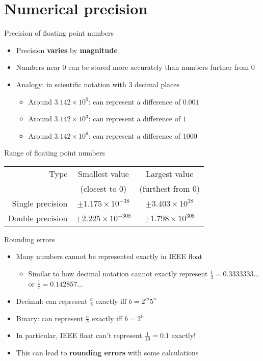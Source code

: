 \part{Numerical precision}
\frame{\partpage}

\begin{frame}{Precision of floating point numbers}
	\begin{itemize}
		\pause\item Precision \textbf{varies} by \textbf{magnitude}
		\pause\item Numbers near 0 can be stored more accurately than numbers further from 0
		\pause\item Analogy: in scientific notation with 3 decimal places
			\begin{itemize}
				\pause\item Around $3.142 \times 10^0$: can represent a difference of $0.001$
				\pause\item Around $3.142 \times 10^3$: can represent a difference of $1$
				\pause\item Around $3.142 \times 10^6$: can represent a difference of $1000$
			\end{itemize}
	\end{itemize}
\end{frame}

\begin{frame}[fragile]{Range of floating point numbers}
	\begin{center}
		\begin{tabular}{|r|cc|}
			\hline
			Type & Smallest value & Largest value \\
			& (closest to 0) & (furthest from 0) \\\hline
			Single precision & $\pm 1.175 \times 10^{-38}$ & $\pm 3.403 \times 10^{38}$ \\\hline
			Double precision & $\pm 2.225 \times 10^{-308}$ & $\pm 1.798 \times 10^{308}$ \\\hline
		\end{tabular}
	\end{center}
\end{frame}

\begin{frame}{Rounding errors}
	\begin{itemize}
		\pause\item Many numbers cannot be represented exactly in IEEE float
			\begin{itemize}
				\pause\item Similar to how decimal notation cannot exactly represent
					$\frac13 = 0.3333333\dots$ or $\frac17 = 0.142857\dots$
			\end{itemize}
		\pause\item Decimal: can represent $\frac{a}{b}$ exactly iff $b = 2^m 5^n$
		\pause\item Binary: can represent $\frac{a}{b}$ exactly iff $b = 2^n$
		\pause\item In particular, IEEE float can't represent $\frac{1}{10} = 0.1$ exactly!
		\pause\item This can lead to \textbf{rounding errors} with some calculations
	\end{itemize}
\end{frame}

